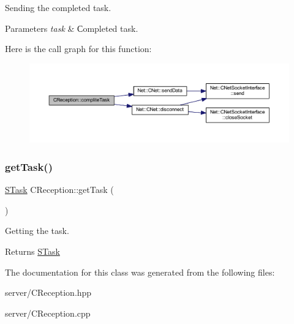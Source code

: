 Sending the completed task. 


\begin{DoxyParams}{Parameters}
{\em task} & Сompleted task. \\
\hline
\end{DoxyParams}
Here is the call graph for this function\+:
\nopagebreak
\begin{figure}[H]
\begin{center}
\leavevmode
\includegraphics[width=350pt]{class_c_reception_a286512c534ff02e51e8217241dd89727_cgraph}
\end{center}
\end{figure}
\mbox{\label{class_c_reception_a842ffb5e64b4e65ff9faa087ffcd31fe}} 
\subsubsection{\texorpdfstring{get\+Task()}{getTask()}}
{\footnotesize\ttfamily \mbox{\hyperlink{struct_s_task}{S\+Task}} C\+Reception\+::get\+Task (\begin{DoxyParamCaption}{ }\end{DoxyParamCaption})}



Getting the task. 

\begin{DoxyReturn}{Returns}
\mbox{\hyperlink{struct_s_task}{S\+Task}} 
\end{DoxyReturn}


The documentation for this class was generated from the following files\+:\begin{DoxyCompactItemize}
\item 
server/C\+Reception.\+hpp\item 
server/C\+Reception.\+cpp\end{DoxyCompactItemize}
